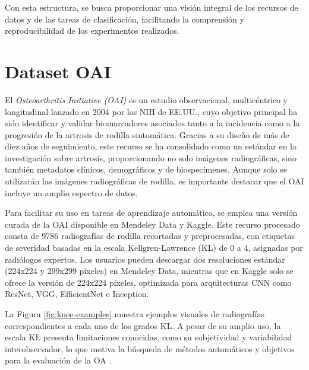 \documentclass[11pt,spanish,listoffigures,listoftables]{tfgetsinf}
\begin{document}
Con esta estructura, se busca proporcionar una visión integral de los recursos de datos y de las tareas de clasificación, facilitando la comprensión y reproducibilidad 
de los experimentos realizados.

\section{Dataset OAI}
\label{sec:3_2_dataset_oai}

El \emph{Osteoarthritis Initiative (OAI)} es un estudio observacional, multicéntrico y longitudinal lanzado en 2004 
por los NIH de EE.UU., cuyo objetivo principal ha sido identificar y validar biomarcadores asociados tanto a la 
incidencia como a la progresión de la artrosis de rodilla sintomática. Gracias a su diseño de más de diez años de 
seguimiento, este recurso se ha consolidado como un estándar en la investigación sobre artrosis, proporcionando no 
solo imágenes radiográficas, sino también metadatos clínicos, demográficos y de biospecímenes. Aunque solo se utilizarán
las imágenes radiográficas de rodilla, es importante destacar que el OAI incluye un amplio espectro de datos,

Para facilitar su uso en tareas de aprendizaje automático, se emplea una versión curada de la OAI disponible en 
Mendeley Data y Kaggle. Este recurso procesado consta de 9786 radiografías de rodilla recortadas y preprocesadas, 
con etiquetas de severidad basadas en la escala Kellgren-Lawrence (KL) de 0 a 4, asignadas por radiólogos expertos. 
Los usuarios pueden descargar dos resoluciones estándar (224x224 y 299x299 píxeles) en Mendeley Data, mientras que 
en Kaggle solo se ofrece la versión de 224x224 píxeles, optimizada para arquitecturas CNN como ResNet, VGG, 
EfficientNet e Inception.

La Figura \ref{fig:knee-examples} muestra ejemplos visuales de radiografías correspondientes a cada uno de los grados KL. A pesar de su amplio uso, la escala KL presenta 
limitaciones conocidas, como su subjetividad y variabilidad interobservador, lo que motiva la búsqueda de métodos automáticos y objetivos para la evaluación de la OA 
\cite{chen2019fully}.
\end{document}
